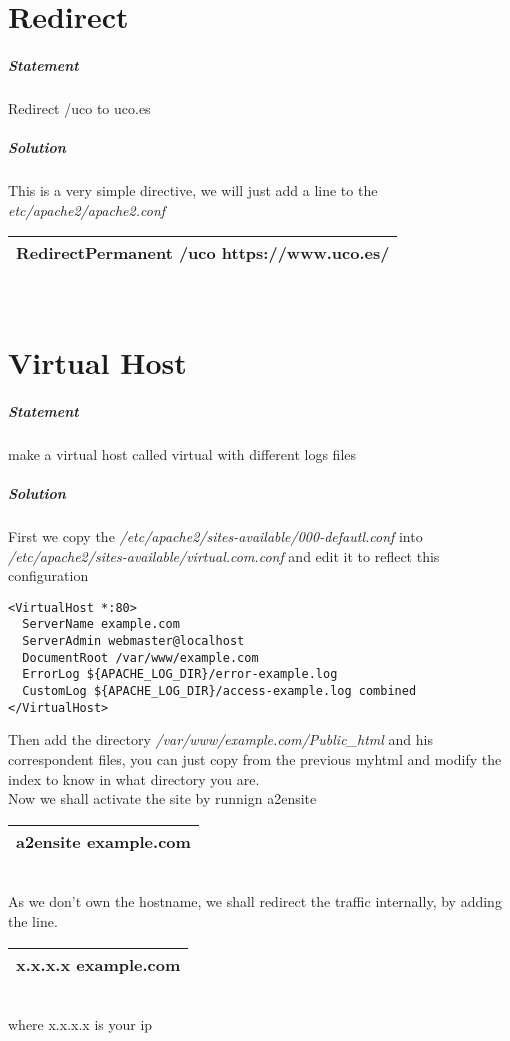 \documentclass[a4paper,10pt]{article}
\begin{document}
\section{Redirect}
\subparagraph{Statement}
Redirect /uco to uco.es
\subparagraph{Solution}
This is a very simple directive, we will just add a line to the {\it etc/apache2/apache2.conf}
\vspace{0.5cm}\\\begin{tabular}{|l|}\hline
RedirectPermanent /uco https://www.uco.es/
\\\hline\end{tabular}\vspace{0.5cm}\\

\section{Virtual Host}
\subparagraph{Statement}
make a virtual host called virtual with different logs files
\subparagraph{Solution}
First we copy the {\it /etc/apache2/sites-available/000-defautl.conf} into {\it /etc/apache2/sites-available/virtual.com.conf} and edit it to reflect this configuration
\begin{verbatim}
<VirtualHost *:80>
  ServerName example.com
  ServerAdmin webmaster@localhost
  DocumentRoot /var/www/example.com
  ErrorLog ${APACHE_LOG_DIR}/error-example.log
  CustomLog ${APACHE_LOG_DIR}/access-example.log combined
</VirtualHost>
\end{verbatim}
Then add the directory {\it /var/www/example.com/Public\_html} and his correspondent files, you can just copy from the previous myhtml and modify the index to know in what directory you are.\vspace{0.5cm}\\
Now we shall activate the site by runnign a2ensite
\vspace{0.5cm}\\\begin{tabular}{|l|}\hline
a2ensite example.com
\\\hline\end{tabular}\vspace{0.5cm}\\
As we don't own the hostname, we shall redirect the traffic internally, by adding the line.
\vspace{0.5cm}\\\begin{tabular}{|l|}\hline
x.x.x.x example.com
\\\hline\end{tabular}\vspace{0.5cm}\\
where x.x.x.x is your ip
\pagebreak
\end{document}
